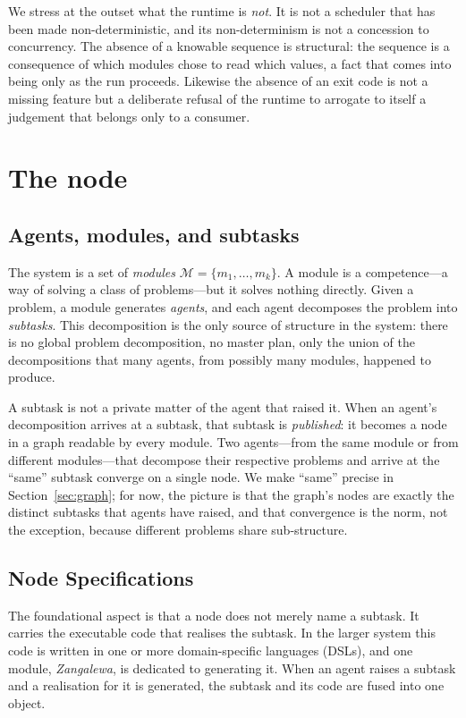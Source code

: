 \documentclass[11pt,a4paper,twocolumn]{article}
\theoremstyle{definition}
\newcommand{\Modules}{\mathcal{M}}
\begin{document}
We stress at the outset what the runtime is \emph{not}. It is not a scheduler
that has been made non-deterministic, and its non-determinism is not a
concession to concurrency. The absence of a knowable sequence is structural: the
sequence is a consequence of which modules chose to read which values, a fact
that comes into being only as the run proceeds. Likewise the absence of an exit
code is not a missing feature but a deliberate refusal of the runtime to
arrogate to itself a judgement that belongs only to a consumer.

\section{The node}
\label{sec:node}

\subsection{Agents, modules, and subtasks}

The system is a set of \emph{modules} $\Modules = \{m_1, \dots, m_k\}$. A module
is a competence---a way of solving a class of problems---but it solves nothing
directly. Given a problem, a module generates \emph{agents}, and each agent
decomposes the problem into \emph{subtasks}. This decomposition is the only
source of structure in the system: there is no global problem
decomposition, no master plan, only the union of the decompositions that many
agents, from possibly many modules, happened to produce.

A subtask is not a private matter of the agent that raised it. When an agent's
decomposition arrives at a subtask, that subtask is \emph{published}: it becomes
a node in a graph readable by every module. Two agents---from the same module or
from different modules---that decompose their respective problems and arrive at
the ``same'' subtask converge on a single node. We make ``same'' precise in
Section~\ref{sec:graph}; for now, the picture is that the graph's nodes are
exactly the distinct subtasks that agents have raised, and that convergence is
the norm, not the exception, because different problems share sub-structure.

\subsection{Node Specifications}

The foundational aspect is that a node does not merely name a subtask. It carries the
executable code that realises the subtask. In the larger system this code is
written in one or more domain-specific languages (DSLs), and one module,
\emph{Zangalewa}, is dedicated to generating it. When an agent raises a subtask
and a realisation for it is generated, the subtask and its code are fused into
one object.
\end{document}
